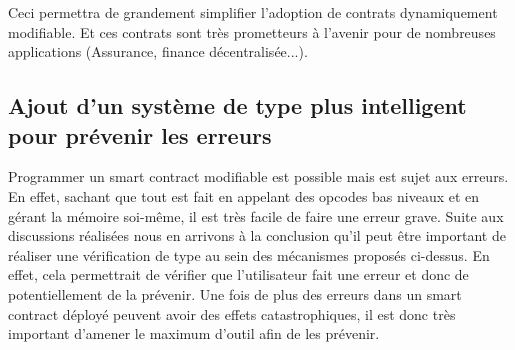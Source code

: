 Ceci permettra de grandement simplifier l'adoption de contrats dynamiquement modifiable. Et ces contrats sont très
prometteurs à l'avenir pour de nombreuses applications (Assurance, finance décentralisée...).

\subsection{Ajout d'un système de type plus intelligent pour prévenir les erreurs}
Programmer un smart contract modifiable est possible mais est sujet aux erreurs. En effet, sachant que tout est fait
en appelant des opcodes bas niveaux et en gérant la mémoire soi-même, il est très facile de faire une erreur grave.
Suite aux discussions réalisées nous en arrivons à la conclusion qu'il peut être important de réaliser une vérification
de type au sein des mécanismes proposés ci-dessus. En effet, cela permettrait de vérifier que l'utilisateur fait une erreur
et donc de potentiellement de la prévenir. Une fois de plus des erreurs dans un smart contract déployé peuvent
avoir des effets catastrophiques, il est donc très important d'amener le maximum d'outil afin de les prévenir.

